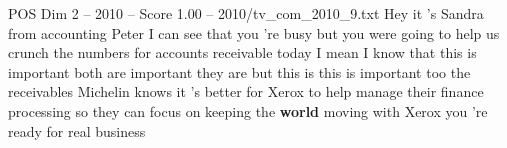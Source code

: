 \begin{textsample}{POS Dim 2 – 2010 – Score 1.00 – 2010/tv\_com\_2010\_9.txt}  \label{ex:f2_pos_046}
Hey it 's Sandra from accounting Peter I can see that you 're busy but you were going to help us crunch the numbers for accounts receivable today I mean I know that this is important both are important they are but this is this is important too the receivables Michelin knows it 's better for Xerox to help manage their finance processing so they can focus on keeping the \textbf{world} moving with Xerox you 're ready for real business

\end{textsample}

